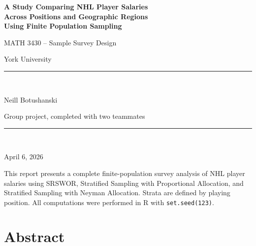 \documentclass[12pt]{article}
\begin{document}
\begin{titlepage}
  \centering
  \vspace*{2cm}
  {\LARGE\bfseries A Study Comparing NHL Player Salaries\\[0.5em]
  Across Positions and Geographic Regions\\[0.5em]
  Using Finite Population Sampling\par}
  \vspace{1.5cm}
  {\large MATH 3430 -- Sample Survey Design\par}
  {\large York University\par}
  \vspace{1cm}
  \rule{0.5\textwidth}{0.4pt}\\[0.6cm]
  {\large Neill Botushanski\par}
  \vspace{0.3cm}
  {\normalsize Group project, completed with two teammates\par}
  \vspace{0.8cm}
  \rule{0.5\textwidth}{0.4pt}\\[0.6cm]
  {\large April 6, 2026\par}
  \vfill
  \begin{tcolorbox}[colback=gray!8, colframe=gray!50, width=0.85\textwidth]
    \small\centering
    This report presents a complete finite-population survey analysis of NHL player
    salaries using SRSWOR, Stratified Sampling with Proportional Allocation, and
    Stratified Sampling with Neyman Allocation. Strata are defined by playing position.
    All computations were performed in \textsf{R} with \texttt{set.seed(123)}.
  \end{tcolorbox}
\end{titlepage}

\tableofcontents
\newpage

\section{Abstract}
\end{document}
